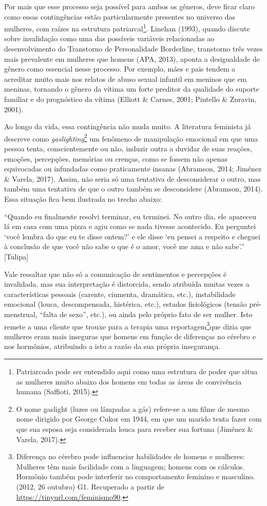 Por mais que esse processo seja possível para ambos os gêneros, deve ficar claro como essas contingências estão particularmente presentes no universo das mulheres, com raízes na estrutura patriarcal\footnote{Patriarcado pode ser entendido aqui como uma estrutura de poder que situa as mulheres muito abaixo dos homens em todas as áreas de convivência humana (Saffioti, 2015).}. Linehan (1993), quando discute sobre invalidação como uma das possíveis variáveis relacionadas ao desenvolvimento do Transtorno de Personalidade Borderline, transtorno três vezes mais prevalente em mulheres que homens (APA, 2013), aponta a desigualdade de gênero como essencial nesse processo. Por exemplo, mães e pais tendem a acreditar muito mais nos relatos de abuso sexual infantil em meninos que em meninas, tornando o gênero da vítima um forte preditor da qualidade do suporte familiar e do prognóstico da vítima (Elliott \& Carnes, 2001; Pintello \& Zuravin, 2001).

Ao longo da vida, essa contingência não muda muito. A literatura feminista já descreve como \textit{gaslighting}\footnote{O nome gaslight (luzes ou lâmpadas a gás) refere-se a um filme de mesmo nome dirigido por George Cukor em 1944, em que um marido tenta fazer com que sua esposa seja considerada louca para receber sua fortuna (Jiménez \& Varela, 2017).} um fenômeno de manipulação emocional em que uma pessoa tenta, conscientemente ou não, induzir outra a duvidar de suas reações, emoções, percepções, memórias ou crenças, como se fossem não apenas equivocadas ou infundadas como praticamente insanas (Abramson, 2014; Jiménez \& Varela, 2017). Assim, não seria só uma tentativa de desconsiderar o outro, mas também uma tentativa de que o outro também se desconsidere (Abramson, 2014). Essa situação fica bem ilustrada no trecho abaixo:

``Quando eu finalmente resolvi terminar, eu terminei. No outro dia, ele apareceu lá em casa com uma pizza e agiu como se nada tivesse acontecido. Eu perguntei ‘você lembra do que eu te disse ontem?’ e ele disse ‘eu pensei a respeito e cheguei à conclusão de que você não sabe o que é o amor, você me ama e não sabe’.'' [Tulipa]

Vale ressaltar que não só a comunicação de sentimentos e percepções é invalidada, mas sua interpretação é distorcida, sendo atribuída muitas vezes a características pessoais (carente, ciumenta, dramática, etc.), instabilidade emocional (louca, descompensada, histérica, etc.), estados fisiológicos (tensão pré-menstrual, ``falta de sexo'', etc.), ou ainda pelo próprio fato de ser mulher. Isto remete a uma cliente que trouxe para a terapia uma reportagem\footnote{Diferença no cérebro pode influenciar habilidades de homens e mulheres: Mulheres têm mais facilidade com a linguagem; homens com os cálculos. Hormônio também pode interferir no comportamento feminino e masculino. (2012, 26 outubro) G1. Recuperado a partir de \url{https://tinyurl.com/feminismo90}.}que dizia que mulheres eram mais inseguras que homens em função de diferenças no cérebro e nos hormônios, atribuindo a isto a razão da sua própria insegurança.

